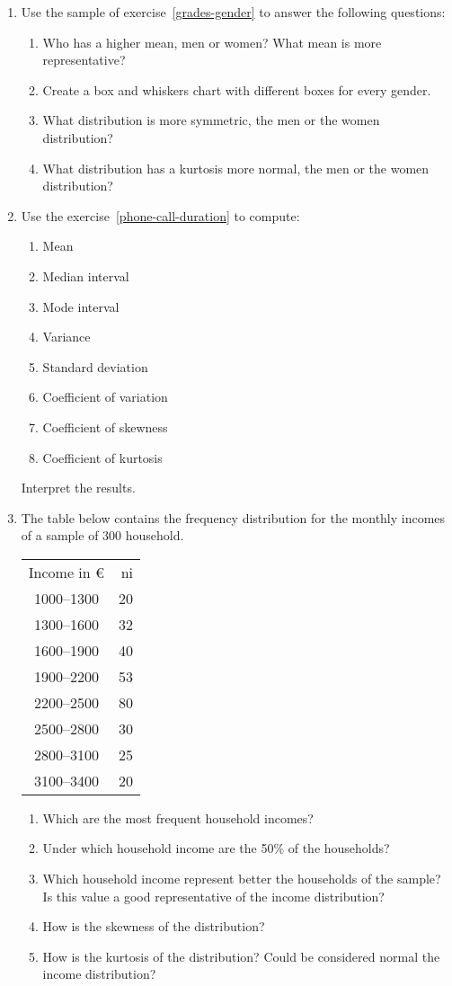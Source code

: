\begin{enumerate}[leftmargin=*,resume]
\item Use the sample of exercise~\ref{grades-gender} to answer the following questions:
\begin{enumerate}
\item Who has a higher mean, men or women?
What mean is more representative?
\item Create a box and whiskers chart with different boxes for every gender. 
\item What distribution is more symmetric, the men or the women distribution?
\item What distribution has a kurtosis more normal, the men or the women distribution?
\end{enumerate}

\item Use the exercise~\ref{phone-call-duration} to compute:
\begin{enumerate}
\item Mean
\item Median interval
\item Mode interval
\item Variance
\item Standard deviation
\item Coefficient of variation
\item Coefficient of skewness
\item Coefficient of kurtosis
\end{enumerate}
Interpret the results. 

\item The table below contains the frequency distribution for the monthly incomes of a sample of 300 household.
\begin{center}
\begin{tabular}{cr}
\toprule
Income in € & 	ni\\
1000--1300	&	20\\
1300--1600	&	32\\
1600--1900	&	40\\
1900--2200	&	53\\
2200--2500	&	80\\
2500--2800	&	30\\
2800--3100	&	25\\
3100--3400	&	20\\
\bottomrule
\end{tabular}
\end{center}

\begin{enumerate}
\item Which are the most frequent household incomes?
\item Under which household income are the 50\% of the households? 
\item Which household income represent better the households of the sample? Is this value a good representative
of the income distribution?
\item How is the skewness of the distribution?
\item How is the kurtosis of the distribution? Could be considered normal the income distribution?
\end{enumerate}

\end{enumerate}